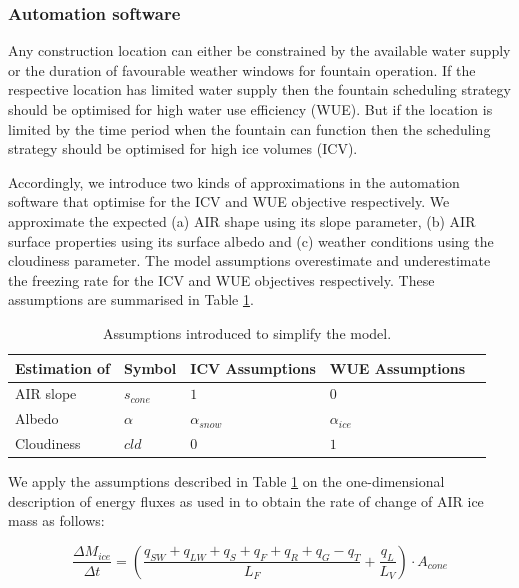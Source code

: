 \documentclass[tc, manuscript]{copernicus}
\begin{document}
\subsubsection{Automation software}

Any construction location can either be constrained by the available water supply or the duration of favourable
weather windows for fountain operation. If the respective location has limited water supply then the fountain
scheduling strategy should be optimised for high water use efficiency (WUE). But if the location is limited by
the time period when the fountain can function then the scheduling strategy should be optimised for high ice
volumes (ICV).

Accordingly, we introduce two kinds of approximations in the automation software that optimise for the ICV and
WUE objective respectively. We approximate the expected (a) AIR shape using its slope parameter, (b) AIR surface
properties using its surface albedo and (c) weather conditions using the cloudiness parameter. The model
assumptions overestimate and underestimate the freezing rate for the ICV and WUE objectives respectively. These
assumptions are summarised in Table \ref{tab:assumptions}. 

\begin{table}[]
\centering
\caption{Assumptions introduced to simplify the model.}
\label{tab:assumptions}
\begin{tabular}{@{}lllll@{}}
\toprule
\textbf{Estimation of} & \textbf{Symbol} & \textbf{ICV Assumptions} & \textbf{WUE Assumptions} & \\ \midrule
\multicolumn{1}{|l}{AIR slope}        & $s_{cone}$ & $ 1 $ & $0$ & \multicolumn{1}{l|}{} \\ \midrule
\multicolumn{1}{|l}{Albedo} & $\alpha$ & $\alpha_{snow}$ & $\alpha_{ice}$ & \multicolumn{1}{l|}{} \\\midrule 
\multicolumn{1}{|l}{Cloudiness}  & $cld$ & $0$ & $1$ & \multicolumn{1}{l|}{} \\ \bottomrule
\end{tabular}
\end{table}

We apply the assumptions described in Table \ref{tab:assumptions} on the one-dimensional description of energy
fluxes as used in \cite{balasubramanianInfluenceMeteorologicalConditions2022} to obtain the rate of change of
AIR ice mass as follows: 

\begin{equation}
  \frac{\Delta M_{ice}}{\Delta t}  =  (\frac{q_{SW} + q_{LW} + q_{S} + q_{F} + q_{R} + q_{G} - q_{T}}{L_F} + \frac{q_{L}}{L_V} ) \cdot A_{cone}
	\label{eqn:auto}
\end{equation}
\end{document}
